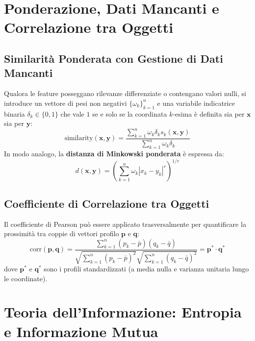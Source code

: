 \section{Ponderazione, Dati Mancanti e Correlazione tra Oggetti}
\label{sec:dm-weighting-correlation}

\subsection{Similarità Ponderata con Gestione di Dati Mancanti}
Qualora le feature posseggano rilevanze differenziate o contengano valori nulli, si introduce un vettore di pesi non negativi $\{\omega_k\}_{k=1}^n$ e una variabile indicatrice binaria $\delta_k \in \{0, 1\}$ che vale $1$ se e solo se la coordinata $k$-esima è definita sia per $\mathbf{x}$ sia per $\mathbf{y}$:
\begin{equation}
    \text{similarity}(\mathbf{x}, \mathbf{y}) = \frac{\sum_{k=1}^n \omega_k \delta_k s_k(\mathbf{x}, \mathbf{y})}{\sum_{k=1}^n \omega_k \delta_k}
\end{equation}
In modo analogo, la \textbf{distanza di Minkowski ponderata} è espressa da:
\begin{equation}
    d(\mathbf{x}, \mathbf{y}) = \left( \sum_{k=1}^n \omega_k |x_k - y_k|^r \right)^{1/r}
\end{equation}

\subsection{Coefficiente di Correlazione tra Oggetti}
Il coefficiente di Pearson può essere applicato trasversalmente per quantificare la prossimità tra coppie di vettori profilo $\mathbf{p}$ e $\mathbf{q}$:
\begin{equation}
    \text{corr}(\mathbf{p}, \mathbf{q}) = \frac{\sum_{k=1}^n (p_k - \bar{p})(q_k - \bar{q})}{\sqrt{\sum_{k=1}^n (p_k - \bar{p})^2} \sqrt{\sum_{k=1}^n (q_k - \bar{q})^2}} = \mathbf{p}^* \cdot \mathbf{q}^*
\end{equation}
dove $\mathbf{p}^*$ e $\mathbf{q}^*$ sono i profili standardizzati (a media nulla e varianza unitaria lungo le coordinate).

\section{Teoria dell'Informazione: Entropia e Informazione Mutua}
\label{sec:dm-information-theory}

